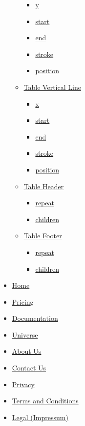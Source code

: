 \begin{itemize}
\begin{itemize}
    \begin{itemize}
    \tightlist
    \item
      \hyperref[definitions-hline-y]{y}
    \item
      \hyperref[definitions-hline-start]{start}
    \item
      \hyperref[definitions-hline-end]{end}
    \item
      \hyperref[definitions-hline-stroke]{stroke}
    \item
      \hyperref[definitions-hline-position]{position}
    \end{itemize}
  \item
    \hyperref[definitions-vline]{Table Vertical Line}

    \begin{itemize}
    \tightlist
    \item
      \hyperref[definitions-vline-x]{x}
    \item
      \hyperref[definitions-vline-start]{start}
    \item
      \hyperref[definitions-vline-end]{end}
    \item
      \hyperref[definitions-vline-stroke]{stroke}
    \item
      \hyperref[definitions-vline-position]{position}
    \end{itemize}
  \item
    \hyperref[definitions-header]{Table Header}

    \begin{itemize}
    \tightlist
    \item
      \hyperref[definitions-header-repeat]{repeat}
    \item
      \hyperref[definitions-header-children]{children}
    \end{itemize}
  \item
    \hyperref[definitions-footer]{Table Footer}

    \begin{itemize}
    \tightlist
    \item
      \hyperref[definitions-footer-repeat]{repeat}
    \item
      \hyperref[definitions-footer-children]{children}
    \end{itemize}
  \end{itemize}
\end{itemize}

\begin{itemize}
\tightlist
\item
  \href{/}{Home}
\item
  \href{/pricing/}{Pricing}
\item
  \href{/docs/}{Documentation}
\item
  \href{/universe/}{Universe}
\item
  \href{/about/}{About Us}
\item
  \href{/contact/}{Contact Us}
\item
  \href{/privacy/}{Privacy}
\item
  \href{https://typst.app/terms}{Terms and Conditions}
\item
  \href{/legal/}{Legal (Impressum)}
\end{itemize}

